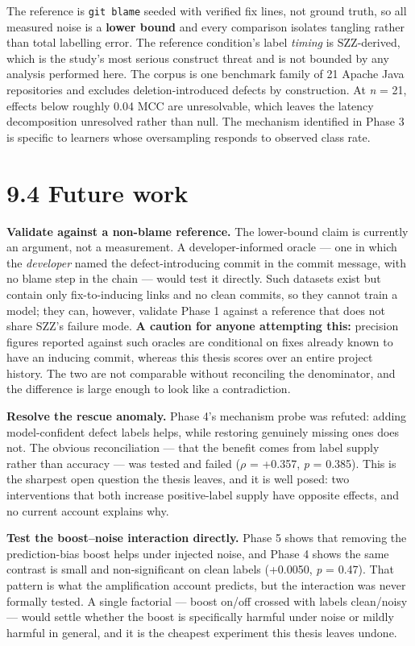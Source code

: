 The reference is \texttt{git\ blame} seeded with verified fix lines, not
ground truth, so all measured noise is a \textbf{lower bound} and every
comparison isolates tangling rather than total labelling error. The
reference condition's label \emph{timing} is SZZ-derived, which is the
study's most serious construct threat and is not bounded by any analysis
performed here. The corpus is one benchmark family of 21 Apache Java
repositories and excludes deletion-introduced defects by construction.
At \emph{n} = 21, effects below roughly 0.04 MCC are unresolvable, which
leaves the latency decomposition unresolved rather than null. The
mechanism identified in Phase 3 is specific to learners whose
oversampling responds to observed class rate.

\section{9.4 Future work}\label{future-work}

\textbf{Validate against a non-blame reference.} The lower-bound claim
is currently an argument, not a measurement. A developer-informed oracle
--- one in which the \emph{developer} named the defect-introducing
commit in the commit message, with no blame step in the chain --- would
test it directly. Such datasets exist but contain only fix-to-inducing
links and no clean commits, so they cannot train a model; they can,
however, validate Phase 1 against a reference that does not share SZZ's
failure mode. \textbf{A caution for anyone attempting this:} precision
figures reported against such oracles are conditional on fixes already
known to have an inducing commit, whereas this thesis scores over an
entire project history. The two are not comparable without reconciling
the denominator, and the difference is large enough to look like a
contradiction.

\textbf{Resolve the rescue anomaly.} Phase 4's mechanism probe was
refuted: adding model-confident defect labels helps, while restoring
genuinely missing ones does not. The obvious reconciliation --- that the
benefit comes from label supply rather than accuracy --- was tested and
failed (\ensuremath{\rho} = +0.357, \emph{p} = 0.385). This is the sharpest open
question the thesis leaves, and it is well posed: two interventions that
both increase positive-label supply have opposite effects, and no
current account explains why.

\textbf{Test the boost--noise interaction directly.} Phase 5 shows that
removing the prediction-bias boost helps under injected noise, and Phase
4 shows the same contrast is small and non-significant on clean labels
(+0.0050, \emph{p} = 0.47). That pattern is what the amplification
account predicts, but the interaction was never formally tested. A
single factorial --- boost on/off crossed with labels clean/noisy ---
would settle whether the boost is specifically harmful under noise or
mildly harmful in general, and it is the cheapest experiment this thesis
leaves undone.

